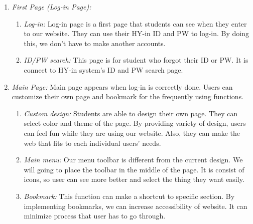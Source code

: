 \documentclass[conference]{IEEEtran}
\begin{document}
\begin{enumerate}
	\item \textit {First Page (Log-in Page):} \\
    \begin{enumerate}
    	\item \textit {Log-in:} Log-in page is a first page that students can see when they enter to our website. They can use their HY-in ID and PW to log-in. By doing this, we don’t have to make another accounts.\\
        \item \textit {ID/PW search:} This page is for student who forgot their ID or PW. It is connect to HY-in system’s ID and PW search page.\\
    \end{enumerate}
    
    \item \textit {Main Page:} Main page appears when log-in is correctly done. Users can customize their own page and bookmark for the frequently using functions. \\
    \begin{enumerate}
    	\item \textit {Custom design:} Students are able to design their own page. They can select color and theme of the page. By providing variety of design, users can feel fun while they are using our website. Also, they can make the web that fits to each individual users’ needs.\\
        \item \textit {Main menu:} Our menu toolbar is different from the current design. We will going to place the toolbar in the middle of the page. It is consist of icons, so user can see more better and select the thing they want easily. \\
        \item \textit {Bookmark:} This function can make a shortcut to specific section. By implementing bookmarks, we can increase accessibility of website. It can minimize process that user has to go through.\\
    \end{enumerate}
    

\end{enumerate}
\end{document}
